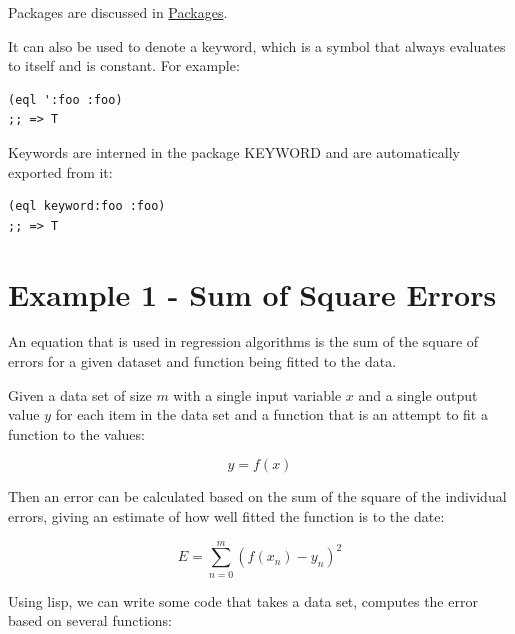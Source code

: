 \documentclass[11pt]{article}
\begin{document}
Packages are discussed in \hyperref[sec-16]{Packages}.

It can also be used to denote a keyword, which is a symbol that
always evaluates to itself and is constant. For example:

\begin{verbatim}
(eql ':foo :foo)
;; => T
\end{verbatim}

Keywords are interned in the package KEYWORD and are automatically
exported from it:

\begin{verbatim}
(eql keyword:foo :foo)
;; => T
\end{verbatim}

\section{Example 1 - Sum of Square Errors}
\label{sec-3}

An equation that is used in regression algorithms is the sum of
the square of errors for a given dataset and function being fitted
to the data.

Given a data set of size $m$ with a single input variable $x$ and a
single output value $y$ for each item in the data set
and a function that is an attempt to fit a function to the values:

$$y = f(x)$$

Then an error can be calculated based on the sum of the square of
the individual errors, giving an estimate of how well fitted the
function is to the date:

$$E = \sum_{n=0}^m(f(x_n) - y_n)^2$$

Using lisp, we can write some code that takes a data set, computes
the error based on several functions:
\end{document}
